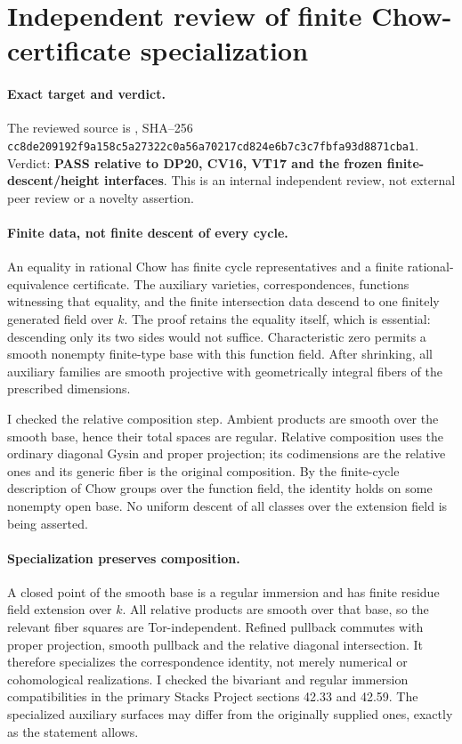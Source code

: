 \section{Independent review of finite Chow-certificate specialization}
\label{r20audit:GCroot}

\paragraph{Exact target and verdict.}
The reviewed source is
,
SHA--256
\texttt{cc8de209192f9a158c5a27322c0a56a70217cd824e6b7c3c7fbfa93d8871cba1}.
Verdict: \textbf{PASS relative to DP20, CV16, VT17 and the frozen
finite-descent/height interfaces}. This is an internal independent
review, not external peer review or a novelty assertion.

\paragraph{Finite data, not finite descent of every cycle.}
An equality in rational Chow has finite cycle representatives and a
finite rational-equivalence certificate. The auxiliary varieties,
correspondences, functions witnessing that equality, and the finite
intersection data descend to one finitely generated field over $k$.
The proof retains the equality itself, which is essential: descending
only its two sides would not suffice. Characteristic zero permits a
smooth nonempty finite-type base with this function field. After
shrinking, all auxiliary families are smooth projective with
geometrically integral fibers of the prescribed dimensions.

I checked the relative composition step. Ambient products are smooth
over the smooth base, hence their total spaces are regular. Relative
composition uses the ordinary diagonal Gysin and proper projection;
its codimensions are the relative ones and its generic fiber is the
original composition. By the finite-cycle description of Chow groups
over the function field, the identity holds on some nonempty open
base. No uniform descent of all classes over the extension field is
being asserted.

\paragraph{Specialization preserves composition.}
A closed point of the smooth base is a regular immersion and has
finite residue field extension over $k$. All relative products are
smooth over that base, so the relevant fiber squares are
Tor-independent. Refined pullback commutes with proper projection,
smooth pullback and the relative diagonal intersection. It therefore
specializes the correspondence identity, not merely numerical or
cohomological realizations. I checked the bivariant and regular
immersion compatibilities in the primary Stacks Project sections
42.33 and 42.59. The specialized auxiliary surfaces may differ from
the originally supplied ones, exactly as the statement allows.

